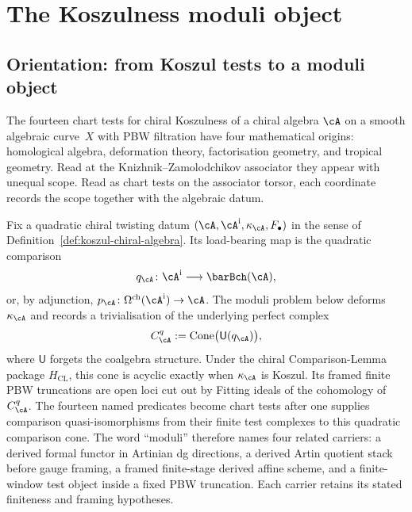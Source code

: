 
\chapter{The Koszulness moduli object}
\label{v1-ch:koszulness-moduli-scheme}

\section{Orientation: from Koszul tests to a moduli object}
\label{v1-sec:kms-orientation}

The fourteen chart tests for chiral Koszulness of a chiral algebra
$\cA$ on a smooth algebraic curve~$X$ with PBW filtration have
four mathematical origins: homological algebra, deformation
theory, factorisation geometry, and tropical geometry. Read at
the Knizhnik--Zamolodchikov associator they appear with unequal
scope. Read as chart tests on the associator torsor, each coordinate
records the scope together with the algebraic datum.

Fix a quadratic chiral twisting datum
$(\cA,\cA^{\mathrm i},\kappa_\cA,F_\bullet)$ in the sense of
Definition~\ref{def:koszul-chiral-algebra}.  Its load-bearing map is
the quadratic comparison
\[
 q_\cA\colon \cA^{\mathrm i}\longrightarrow\barBch(\cA),
\]
or, by adjunction,
$p_\cA\colon\Omega^{\mathrm{ch}}(\cA^{\mathrm i})\to\cA$.
The moduli problem below deforms $\kappa_\cA$ and records a
trivialisation of the underlying perfect complex
\[
 C^q_\cA:=\operatorname{Cone}\bigl(\mathsf U(q_\cA)\bigr),
\]
where $\mathsf U$ forgets the coalgebra structure.  Under the chiral
Comparison-Lemma package $H_{\mathrm{CL}}$, this cone is acyclic
exactly when $\kappa_\cA$ is Koszul.  Its framed finite PBW
truncations are open loci cut out by Fitting ideals of the cohomology
of~$C^q_\cA$.  The fourteen named predicates become chart tests after
one supplies comparison quasi-isomorphisms from their finite test
complexes to this quadratic comparison cone.
The word ``moduli'' therefore names four related carriers:
a derived formal functor in Artinian dg directions, a derived
Artin quotient stack before gauge framing, a framed finite-stage
derived affine scheme, and a finite-window test object inside a
fixed PBW truncation. Each carrier retains its stated finiteness and
framing hypotheses.

